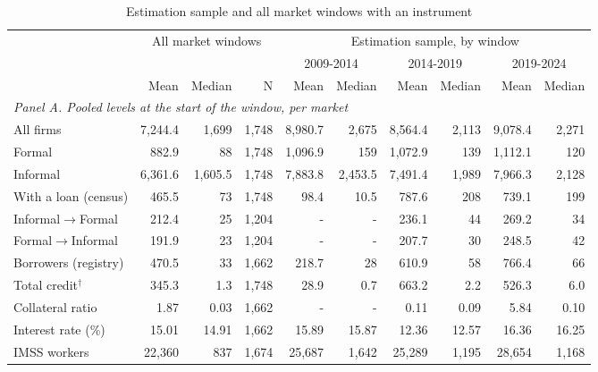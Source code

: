 \documentclass[12pt]{article}
\begin{document}
\begin{table}[H]
    \centering
    \caption{Estimation sample and all market windows with an instrument}
    \label{tab:desc_sample_all}
    \begin{threeparttable}
        \small
        \setlength{\tabcolsep}{3.5pt}
        \renewcommand{\arraystretch}{0.9}
        \begin{tabular}{l r r r r r r r r r}
            \toprule
             & \multicolumn{3}{c}{All market windows} & \multicolumn{6}{c}{Estimation sample, by window} \\
            \cmidrule(lr){2-4} \cmidrule(lr){5-10}
             & & & & \multicolumn{2}{c}{2009-2014} & \multicolumn{2}{c}{2014-2019} & \multicolumn{2}{c}{2019-2024} \\
            \cmidrule(lr){5-6} \cmidrule(lr){7-8} \cmidrule(lr){9-10}
             & Mean & Median & N & Mean & Median & Mean & Median & Mean & Median \\
            \midrule
            \multicolumn{10}{l}{\textit{Panel A. Pooled levels at the start of the window, per market}} \\
            All firms & 7,244.4 & 1,699 & 1,748 & 8,980.7 & 2,675 & 8,564.4 & 2,113 & 9,078.4 & 2,271 \\
            \quad Formal & 882.9 & 88 & 1,748 & 1,096.9 & 159 & 1,072.9 & 139 & 1,112.1 & 120 \\
            \quad Informal & 6,361.6 & 1,605.5 & 1,748 & 7,883.8 & 2,453.5 & 7,491.4 & 1,989 & 7,966.3 & 2,128 \\
            With a loan (census) & 465.5 & 73 & 1,748 & 98.4 & 10.5 & 787.6 & 208 & 739.1 & 199 \\
            Informal$\to$Formal & 212.4 & 25 & 1,204 & - & - & 236.1 & 44 & 269.2 & 34 \\
            Formal$\to$Informal & 191.9 & 23 & 1,204 & - & - & 207.7 & 30 & 248.5 & 42 \\
            Borrowers (registry) & 470.5 & 33 & 1,662 & 218.7 & 28 & 610.9 & 58 & 766.4 & 66 \\
            Total credit$^{\dagger}$ & 345.3 & 1.3 & 1,748 & 28.9 & 0.7 & 663.2 & 2.2 & 526.3 & 6.0 \\
            Collateral ratio & 1.87 & 0.03 & 1,662 & - & - & 0.11 & 0.09 & 5.84 & 0.10 \\
            Interest rate (\%) & 15.01 & 14.91 & 1,662 & 15.89 & 15.87 & 12.36 & 12.57 & 16.36 & 16.25 \\
            IMSS workers & 22,360 & 837 & 1,674 & 25,687 & 1,642 & 25,289 & 1,195 & 28,654 & 1,168 \\

\end{tabular}
\end{threeparttable}
\end{table}
\end{document}
